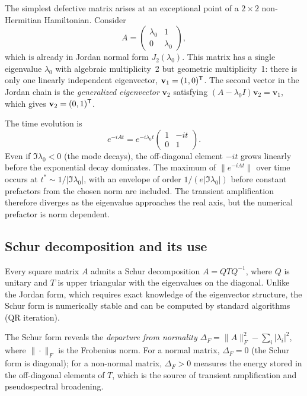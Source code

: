 The simplest defective matrix arises at an exceptional point of a
$2\times 2$ non-Hermitian Hamiltonian. Consider
\begin{equation}
 A = \begin{pmatrix} \lambda_0 & 1 \\ 0 & \lambda_0 \end{pmatrix},
 \label{eq:jordan-2x2-example}
\end{equation}
which is already in Jordan normal form $J_2(\lambda_0)$. This matrix
has a single eigenvalue $\lambda_0$ with algebraic multiplicity~2 but
geometric multiplicity~1: there is only one linearly independent
eigenvector, $\mathbf{v}_1 = (1, 0)^{\mathsf{T}}$. The second vector in
the Jordan chain is the \emph{generalized eigenvector} $\mathbf{v}_2$
satisfying $(A - \lambda_0 I)\mathbf{v}_2 = \mathbf{v}_1$, which gives
$\mathbf{v}_2 = (0, 1)^{\mathsf{T}}$.

The time evolution is
\begin{equation}
 e^{-iAt} = e^{-i\lambda_0 t}
 \begin{pmatrix} 1 & -it \\ 0 & 1 \end{pmatrix}.
 \label{eq:jordan-2x2-evolution}
\end{equation}
Even if $\Im\lambda_0 < 0$ (the mode decays), the off-diagonal element
$-it$ grows linearly before the exponential decay dominates. The
maximum of $\|e^{-iAt}\|$ over time occurs at
$t^* \sim 1/|\Im\lambda_0|$, with an envelope of order
$1/(e|\Im\lambda_0|)$ before constant prefactors from the chosen norm
are included. The transient amplification therefore diverges as the
eigenvalue approaches the real axis, but the numerical prefactor is
norm dependent.

\subsection{Schur decomposition and its use}
\label{ssec:schur-decomp}

Every square matrix $A$ admits a Schur decomposition $A = Q T Q^{-1}$,
where $Q$ is unitary and $T$ is upper triangular with the eigenvalues on
the diagonal. Unlike the Jordan form, which requires exact knowledge of
the eigenvector structure, the Schur form is numerically stable and can
be computed by standard algorithms (QR iteration).

The Schur form reveals the \emph{departure from normality}
$\Delta_F = \|A\|_F^2 - \sum_i |\lambda_i|^2$, where $\|\cdot\|_F$
is the Frobenius norm. For a normal matrix, $\Delta_F = 0$ (the Schur
form is diagonal); for a non-normal matrix, $\Delta_F > 0$ measures the
energy stored in the off-diagonal elements of $T$, which is the source
of transient amplification and pseudospectral broadening.

